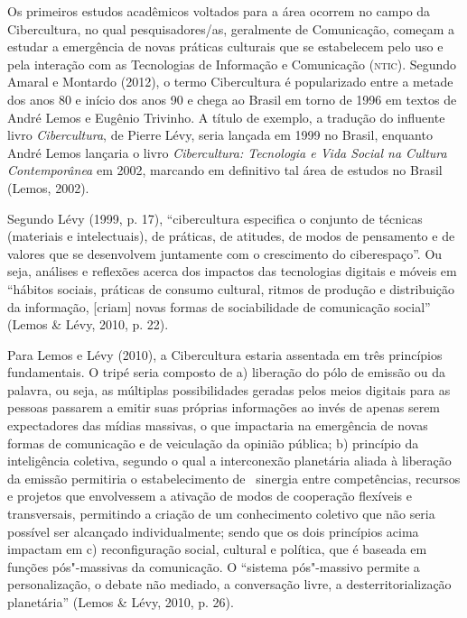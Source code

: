 Os primeiros estudos acadêmicos voltados para a área ocorrem no campo da
Cibercultura, no qual pesquisadores/as, geralmente de Comunicação,
começam a estudar a emergência de novas práticas culturais que se
estabelecem pelo uso e pela interação com as Tecnologias de Informação e
Comunicação (\textsc{ntic}). Segundo Amaral e Montardo (2012), o termo
Cibercultura é popularizado entre a metade dos anos 80 e início dos anos
90 e chega ao Brasil em torno de 1996 em textos de André Lemos e Eugênio
Trivinho. A título de exemplo, a tradução do influente livro
\emph{Cibercultura}, de Pierre Lévy, seria lançada em 1999 no Brasil,
enquanto André Lemos lançaria o livro \emph{Cibercultura: Tecnologia e
Vida Social na Cultura Contemporânea} em 2002, marcando em definitivo
tal área de estudos no Brasil (Lemos, 2002).

Segundo Lévy (1999, p. 17), ``cibercultura especifica o conjunto de
técnicas (materiais e intelectuais), de práticas, de atitudes, de modos
de pensamento e de valores que se desenvolvem juntamente com o
crescimento do ciberespaço''. Ou seja, análises e reflexões acerca dos
impactos das tecnologias digitais e móveis em ``hábitos sociais,
práticas de consumo cultural, ritmos de produção e distribuição da
informação, {[}criam{]} novas formas de sociabilidade de comunicação
social'' (Lemos \& Lévy, 2010, p. 22).

Para Lemos e Lévy (2010), a Cibercultura estaria assentada em três
princípios fundamentais. O tripé seria composto de a) liberação do pólo
de emissão ou da palavra, ou seja, as múltiplas possibilidades geradas
pelos meios digitais para as pessoas passarem a emitir suas próprias
informações ao invés de apenas serem expectadores das mídias massivas, o
que impactaria na emergência de novas formas de comunicação e de
veiculação da opinião pública; b) princípio da inteligência coletiva,
segundo o qual a interconexão planetária aliada à liberação da emissão
permitiria o estabelecimento de ~sinergia entre competências, recursos e
projetos que envolvessem a ativação de modos de cooperação flexíveis e
transversais, permitindo a criação de um conhecimento coletivo que não
seria possível ser alcançado individualmente; sendo que os dois
princípios acima impactam em c) reconfiguração social, cultural e
política, que é baseada em funções pós"-massivas da comunicação. O
``sistema pós"-massivo permite a personalização, o debate não mediado, a
conversação livre, a desterritorialização planetária'' (Lemos \& Lévy,
2010, p. 26).

